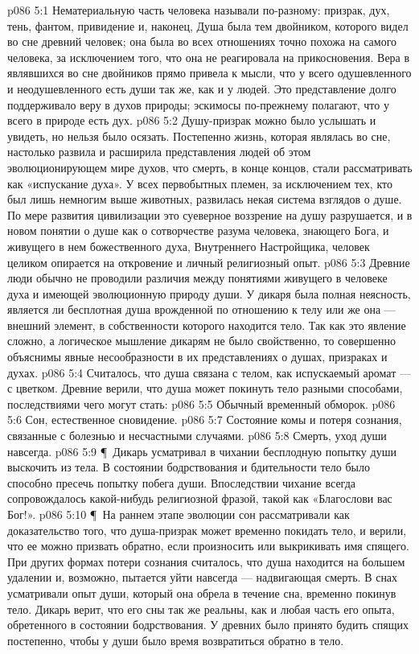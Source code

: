\vs p086 5:1 Нематериальную часть человека называли по\hyp{}разному: призрак, дух, тень, фантом, привидение и, наконец,  Душа была тем двойником, которого видел во сне древний человек; она была во всех отношениях точно похожа на самого человека, за исключением того, что она не реагировала на прикосновения. Вера в являвшихся во сне двойников прямо привела к мысли, что у всего одушевленного и неодушевленного есть души так же, как и у людей. Это представление долго поддерживало веру в духов природы; эскимосы по\hyp{}прежнему полагают, что у всего в природе есть дух.
\vs p086 5:2 Душу\hyp{}призрак можно было услышать и увидеть, но нельзя было осязать. Постепенно жизнь, которая являлась во сне, настолько развила и расширила представления людей об этом эволюционирующем мире духов, что смерть, в конце концов, стали рассматривать как «испускание духа». У всех первобытных племен, за исключением тех, кто был лишь немногим выше животных, развилась некая система взглядов о душе. По мере развития цивилизации это суеверное воззрение на душу разрушается, и в новом понятии о душе как о сотворчестве разума человека, знающего Бога, и живущего в нем божественного духа, Внутреннего Настройщика, человек целиком опирается на откровение и личный религиозный опыт.
\vs p086 5:3 Древние люди обычно не проводили различия между понятиями живущего в человеке духа и имеющей эволюционную природу души. У дикаря была полная неясность, является ли бесплотная душа врожденной по отношению к телу или же она --- внешний элемент, в собственности которого находится тело. Так как это явление сложно, а логическое мышление дикарям не было свойственно, то совершенно объяснимы явные несообразности в их представлениях о душах, призраках и духах.
\vs p086 5:4 Считалось, что душа связана с телом, как испускаемый аромат --- с цветком. Древние верили, что душа может покинуть тело разными способами, последствиями чего могут стать:
\vs p086 5:5 \bibnobreakspace Обычный временный обморок.
\vs p086 5:6 \bibnobreakspace Сон, естественное сновидение.
\vs p086 5:7 \bibnobreakspace Состояние комы и потеря сознания, связанные с болезнью и несчастными случаями.
\vs p086 5:8 \bibnobreakspace Смерть, уход души навсегда.
\vs p086 5:9 \P\ Дикарь усматривал в чихании бесплодную попытку души выскочить из тела. В состоянии бодрствования и бдительности тело было способно пресечь попытку побега души. Впоследствии чихание всегда сопровождалось какой\hyp{}нибудь религиозной фразой, такой как «Благослови вас Бог!».
\vs p086 5:10 \P\ На раннем этапе эволюции сон рассматривали как доказательство того, что душа\hyp{}призрак может временно покидать тело, и верили, что ее можно призвать обратно, если произносить или выкрикивать имя спящего. При других формах потери сознания считалось, что душа находится на большем удалении и, возможно, пытается уйти навсегда --- надвигающая смерть. В снах усматривали опыт души, который она обрела в течение сна, временно покинув тело. Дикарь верит, что его сны так же реальны, как и любая часть его опыта, обретенного в состоянии бодрствования. У древних было принято будить спящих постепенно, чтобы у души было время возвратиться обратно в тело.
